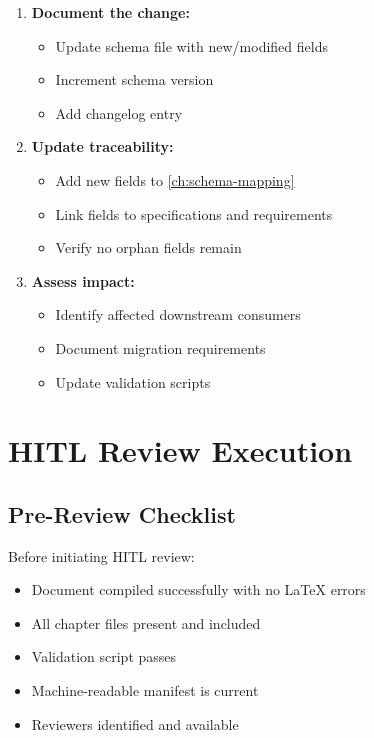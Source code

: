 \documentclass[11pt,a4paper,twoside]{report}
\begin{document}
\begin{enumerate}
\item \textbf{Document the change:}
\begin{itemize}[noitemsep]
\item Update schema file with new/modified fields
\item Increment schema version
\item Add changelog entry
\end{itemize}

\item \textbf{Update traceability:}
\begin{itemize}[noitemsep]
\item Add new fields to \cref{ch:schema-mapping}
\item Link fields to specifications and requirements
\item Verify no orphan fields remain
\end{itemize}

\item \textbf{Assess impact:}
\begin{itemize}[noitemsep]
\item Identify affected downstream consumers
\item Document migration requirements
\item Update validation scripts
\end{itemize}
\end{enumerate}

\section{HITL Review Execution}
\label{sec:review-execution}

\subsection{Pre-Review Checklist}

Before initiating HITL review:

\begin{itemize}
\item[$\square$] Document compiled successfully with no LaTeX errors
\item[$\square$] All chapter files present and included
\item[$\square$] Validation script passes
\item[$\square$] Machine-readable manifest is current
\item[$\square$] Reviewers identified and available
\end{itemize}
\end{document}
